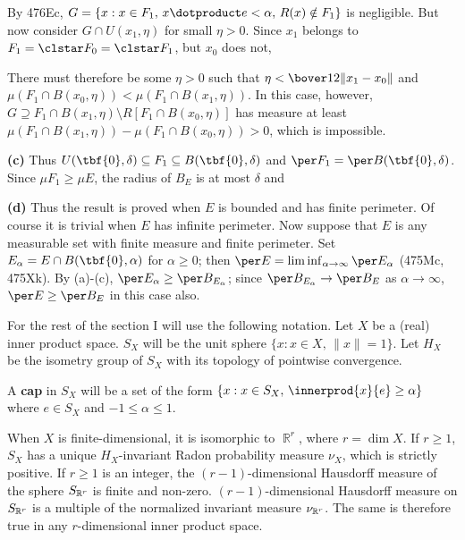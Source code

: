 {\noindent By 476Ec,
$G=\{x:x\in F_1,\,\varinnerprod{x}{e}<\alpha,\,R(x)\notin F_1\}$ is
negligible.   But now consider $G\cap U(x_1,\eta)$ for small $\eta>0$.
Since $x_1$ belongs to $F_1=\clstar F_0=\clstar F_1$, but $x_0$ does
not,


\noindent There must therefore be some $\eta>0$ such that
$\eta<\bover12\|x_1-x_0\|$ and
$\mu(F_1\cap B(x_0,\eta))<\mu(F_1\cap B(x_1,\eta))$.   In this case,
however,
$G\supseteq F_1\cap B(x_1,\eta)\setminus R[F_1\cap B(x_0,\eta)]$ has
measure at least $\mu(F_1\cap B(x_1,\eta))-\mu(F_1\cap B(x_0,\eta))>0$,
which is impossible.\ \Bang\Qed

\medskip

{\bf (c)} Thus
$U(\tbf{0},\delta)\subseteq F_1\subseteq B(\tbf{0},\delta)$ and
$\per F_1=\per B(\tbf{0},\delta)$.   Since $\mu F_1\ge\mu E$, the radius
of $B_E$ is at most $\delta$ and


\medskip

{\bf (d)} Thus the result is proved when $E$ is bounded and has finite
perimeter.   Of course it is trivial when $E$ has infinite perimeter.
Now suppose that $E$ is any measurable set with finite measure and
finite perimeter.   Set $E_{\alpha}=E\cap B(\tbf{0},\alpha)$ for
$\alpha\ge 0$;  then
$\per E=\liminf_{\alpha\to\infty}\per E_{\alpha}$ (475Mc, 475Xk).
By (a)-(c), $\per E_{\alpha}\ge\per B_{E_{\alpha}}$;  since
$\per B_{E_{\alpha}}\to\per B_E$ as $\alpha\to\infty$,
$\per E\ge\per B_E$ in this case also.
}%

 For the rest of the
section I will use the following notation.
Let $X$ be a (real) inner product space. $S_X$ will be
the unit
sphere $\{x:x\in X,\,\|x\|=1\}$.   Let $H_X$ be the isometry group of
$S_X$ with its
topology of pointwise convergence.

A {\bf cap} in $S_X$ will be a set of the form
$\{x:x\in S_X,\,\innerprod{x}{e}\ge\alpha\}$ where $e\in S_X$ and
$-1\le\alpha\le 1$.

When $X$ is finite-dimensional, it is isomorphic to $\BbbR^r$, where $r=\dim X$.   If $r\ge 1$,
$S_X$ has a unique $H_X$-invariant Radon probability measure
$\nu_X$, which is strictly positive.   If $r\ge 1$ is an
integer,  the $(r-1)$-dimensional Hausdorff
measure of the
sphere $S_{\Bbb R^r}$ is finite and non-zero.
 $(r-1)$-dimensional
Hausdorff
measure on $S_{\Bbb R^r}$ is a multiple of the normalized invariant
measure $\nu_{\Bbb R^r}$.   The same is therefore true
in any
$r$-dimensional inner product space.

